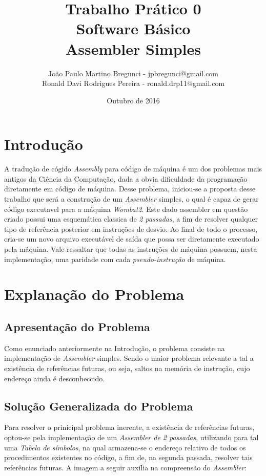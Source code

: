 \documentclass{article}
\title{Trabalho Prático 0 \\ Software Básico
\\ Assembler Simples}
\author{João Paulo Martino Bregunci - jpbregunci@gmail.com
\\ Ronald Davi Rodrigues Pereira - ronald.drp11@gmail.com}
\date{Outubro de 2016}
\begin{document}
\maketitle


\section{Introdução}
A tradução de cógido \textit{Assembly} para código de máquina é um dos problemas mais antigos da Ciência da Computação, dada a obvia dificuldade da programação diretamente em código de máquina. Desse problema, iniciou-se a proposta desse trabalho que será a construção de um \textit{Assembler} simples, o qual é capaz de gerar código executavel para a máquina \textit{Wombat2}. Este dado assembler em questão criado possui uma esquemática classica de \textit{2 passadas}, a fim de resolver qualquer tipo de referência posterior em instruções de desvio.
Ao final de todo o processo, cria-se um novo arquivo executável de saída que possa ser diretamente executado pela máquina. Vale ressaltar que todas as instruções de máquina possuem, nesta implementação, uma paridade com cada \textit{pseudo-instrução} de máquina.


\section{Explanação do Problema}
\subsection{Apresentação do Problema}
Como enunciado anteriormente na Introdução, o problema consiste na implementação de \textit{Assembler} simples. Sendo o maior problema relevante a tal a existência de referências futuras, ou seja, saltos na memória de instrução, cujo endereço ainda é desconheccido.

\subsection{Solução Generalizada do Problema}
Para resolver o prinicipal problema inerente, a existência de referências futuras, optou-se pela implementação de um \textit{Assembler de 2 passadas}, utilizando para tal uma \textit{Tabela de símbolos}, na qual armazena-se o endereço relativo de todos os procedimentos existentes no código, a fim de, na segunda passada, resolver tais referências futuras. A imagem a seguir auxília na compreensão do \textit{Assembler}:
\end{document}
